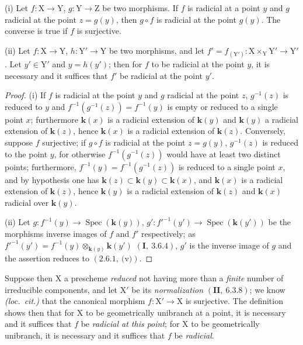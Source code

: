 \begin{lemma}[6.15.3.1]
\label{IV.6.15.3.1}
\textup{(i)} Let $f:\mathrm{X}\to\mathrm{Y}$, $g:\mathrm{Y}\to\mathrm{Z}$ be two morphisms. If $f$ is radicial
at a point $y$ and $g$ radicial at the point $z=g(y)$, then $g\circ f$ is radicial at the point $g(y)$. The converse
is true if $f$ is surjective.

\textup{(ii)} Let $f:\mathrm{X}\to\mathrm{Y}$, $h:\mathrm{Y}'\to\mathrm{Y}$ be two morphisms, and let $f'=f_{(\mathrm{Y}')}:\mathrm{X}\times_\mathrm{Y}\mathrm{Y}'\to\mathrm{Y}'$.
Let $y'\in\mathrm{Y}'$ and $y=h(y')$; then for $f$ to be radicial at the point $y$, it is necessary and it suffices that $f'$ be
radicial at the point $y'$.
\end{lemma}

\begin{proof}
(i) If $f$ is radicial at the point $y$ and $g$ radicial at the point $z$, $g^{-1}(z)$ is reduced to $y$ and
$f^{-1}(g^{-1}(z))=f^{-1}(y)$ is empty or reduced to a single point $x$; furthermore $\boldsymbol{k}(x)$ is a radicial extension
of $\boldsymbol{k}(y)$ and $\boldsymbol{k}(y)$ a radicial extension of $\boldsymbol{k}(z)$, hence $\boldsymbol{k}(x)$ is a radicial extension of $\boldsymbol{k}(z)$.
Conversely, suppose $f$ surjective; if $g\circ f$ is radicial at the point $z=g(y)$, $g^{-1}(z)$ is reduced
to the point $y$, for otherwise $f^{-1}(g^{-1}(z))$ would have at least two distinct points; furthermore,
$f^{-1}(y)=f^{-1}(g^{-1}(z))$ is reduced to a single point $x$, and by hypothesis one has $\boldsymbol{k}(z)\subset\boldsymbol{k}(y)\subset\boldsymbol{k}(x)$,
and $\boldsymbol{k}(x)$ is a radicial extension of $\boldsymbol{k}(z)$, hence $\boldsymbol{k}(y)$ is a radicial extension of $\boldsymbol{k}(z)$ and $\boldsymbol{k}(x)$ radicial over $\boldsymbol{k}(y)$.

(ii) Let $g:f^{-1}(y)\to\operatorname{Spec}(\boldsymbol{k}(y))$, $g':f'^{-1}(y')\to\operatorname{Spec}(\boldsymbol{k}(y'))$ be the morphisms
inverse images of \mbox{\ensuremath{f}} and $f'$ respectively; as $f'^{-1}(y')=f^{-1}(y)\otimes_{\boldsymbol{k}(y)}\boldsymbol{k}(y')$
$(\mathbf{I},~3.6.4)$, $g'$ is the inverse image of $g$ and the assertion reduces to $(2.6.1,~\text{(v)})$.
\end{proof}

Suppose then $\mathrm{X}$ a prescheme \emph{reduced} not having more than a \emph{finite} number of irreducible components,
and let $\mathrm{X}'$ be its \emph{normalization} $(\mathbf{II},~6.3.8)$; we know \emph{(loc.~cit.)} that the canonical morphism
$f:\mathrm{X}'\to\mathrm{X}$ is surjective. The definition  shows then that for $\mathrm{X}$ to be geometrically
unibranch at a point, it is necessary and it suffices that $f$ be \emph{radicial at this point}; for
$\mathrm{X}$ to be geometrically unibranch, it is necessary and it suffices that $f$ be \emph{radicial}.

